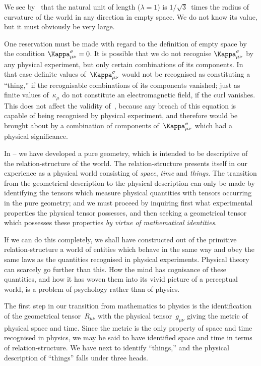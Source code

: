 \documentclass[12pt]{book}
\begin{document}
We see by~ that the natural unit of length ($\lambda= 1$) is $1/\sqrt{3}$~times the
radius of curvature of the world in any direction in empty space. We do not
know its value, but it must obviously be very large.

One reservation must be made with regard to the definition of empty
space by the condition $\Kappa_{\mu\nu}^{\sigma} = 0$. It is possible that we do not recognise $\Kappa_{\mu\nu}^{\sigma}$ by
any physical experiment, but only certain combinations of its components. In
that case definite values of~$\Kappa_{\mu\nu}^{\sigma}$ would not be recognised as constituting a
``thing,'' if the recognisable combinations of its components vanished; just as
finite values of~$\kappa_{\mu}$ do not constitute an electromagnetic field, if the curl
vanishes. This does not affect the validity of~, because any breach of
this equation is capable of being recognised by physical experiment, and
therefore would be brought about by a combination of components of~$\Kappa_{\mu\nu}^{\sigma}$ which
had a physical significance.

%
%

In -- we have developed a pure geometry, which is intended to be descriptive
of the relation-structure of the world. The relation-structure presents
itself in our experience as a physical world consisting of \emph{space}, \emph{time} and \emph{things}.
The transition from the geometrical description to the physical description
can only be made by identifying the tensors which measure physical quantities
with tensors occurring in the pure geometry; and we must proceed by
inquiring first what experimental properties the physical tensor possesses,
and then seeking a geometrical tensor which possesses these properties \emph{by
virtue of mathematical identities}.

If we can do this completely, we shall have constructed out of the primitive
relation-structure a world of entities which behave in the same way and obey
the same laws as the quantities recognised in physical experiments. Physical
theory can scarcely go further than this. How the mind has cognisance of
these quantities, and how it has woven them into its vivid picture of a perceptual
world, is a problem of psychology rather than of physics.

The first step in our transition from mathematics to physics is the identification
of the geometrical tensor~$R_{\mu\nu}$ with the physical tensor~$g_{\mu\nu}$ giving the
metric of physical space and time. Since the metric is the only property of
space and time recognised in physics, we may be said to have identified space
and time in terms of relation-structure. We have next to identify ``things,''
and the physical description of ``things'' falls under three heads.
\end{document}
